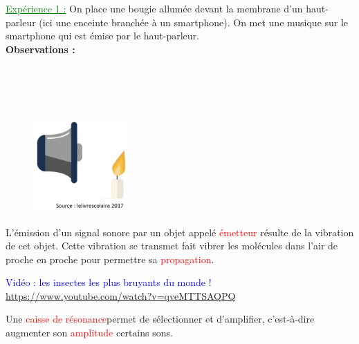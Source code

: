 \textcolor{green}{\underline{Expérience 1 :}} On place une bougie allumée devant la membrane d'un haut-parleur (ici une enceinte branchée à un smartphone). On met une musique sur le smartphone qui est émise par le haut-parleur.\\
\textbf{Observations :} \\
\\
\\
\\
\\
\begin{figure}
\vspace{-7cm}
    \centering
     \includegraphics[width=0.32\textwidth]{Images/Chapitre_3/Haut_parleur_bougie.PNG}
   \end{figure}

\begin{tcolorbox}[colback=red!5!white,colframe=red!75!black,title=\textbf{Propriété de l'émission d'un son : }]
L'émission d'un signal sonore par un objet appelé \textcolor{red}{émetteur} résulte de la vibration de cet objet. Cette vibration se transmet fait vibrer les molécules dans l'air de proche en proche pour permettre sa \textcolor{red}{propagation}.
\end{tcolorbox}

\textcolor{blue}{Vidéo : les insectes les plus bruyants du monde !} \url{https://www.youtube.com/watch?v=qveMTTSAQPQ}
\begin{tcolorbox}[colback=red!5!white,colframe=red!75!black,title=\textbf{Caisse de résonance : }]
Une \textcolor{red}{caisse de résonance}permet de sélectionner et d'amplifier, c'est-à-dire augmenter son \textcolor{red}{amplitude} certains sons.
\end{tcolorbox}

